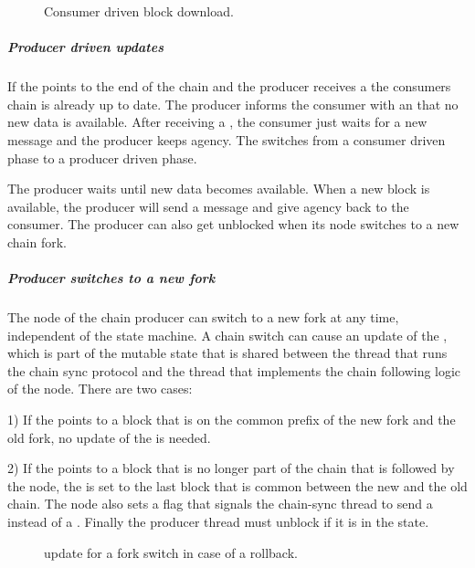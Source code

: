 \begin{figure}[ht]
\begin{center}
\end{center}
\caption{Consumer driven block download.}
\label{read-pointer-consumer-driver}
\end{figure}

\subparagraph{Producer driven updates}
If the \readpointer{} points to the end of the chain and the producer receives
a \MsgRequestNext{}
the consumers chain is already up to date.
The producer informs the consumer with an \MsgAwaitReply{} that no new data is available.
After receiving a \MsgAwaitReply, the consumer just waits for a new message and the producer keeps agency.
The \MsgAwaitReply{} switches from a consumer driven phase to a producer driven phase.

The producer waits until new data becomes available.
When a new block is available, the producer will
send a \MsgRollForward{} message and give agency back to the consumer.
The producer can also get unblocked when its node switches to a new chain fork.

\subparagraph{Producer switches to a new fork}
The node of the chain producer can switch to a new fork at any time, independent of the
state machine.
A chain switch can cause an update of the \readpointer{},
which is part of the mutable state that is shared between the thread that runs
the chain sync protocol and the thread that implements the chain following logic of the node.
There are two cases:

1) If the \readpointer{} points to a block that is on the common prefix of the new
fork and the old fork, no update of the \readpointer{} is needed.

2) If the \readpointer{} points to a block that is no longer part of the chain that is followed by the node,
the \readpointer{} is set to the last block that is common between the new and the old chain.
The node also sets a flag that signals the chain-sync thread to send a \MsgRollBackward{} instead
of a \MsgRollForward.
Finally the producer thread must unblock if it is in the \StMustReply{} state.

\begin{figure}[ht]
\begin{center}
\end{center}
\caption{\readpointer{} update for a fork switch in case of a rollback.}
\label{read-pointer-rollback}
\end{figure}

